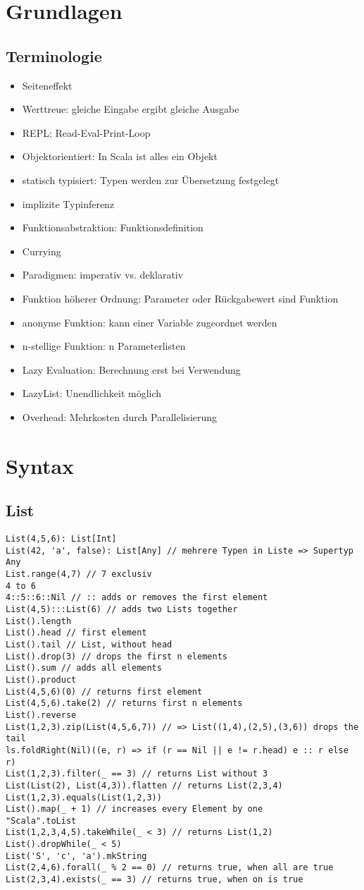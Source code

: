 \section{Grundlagen}
\subsection{Terminologie}
\begin{itemize}
	\item Seiteneffekt
	\item Werttreue: gleiche Eingabe ergibt gleiche Ausgabe
	\item REPL: Read-Eval-Print-Loop
	\item Objektorientiert: In Scala ist alles ein Objekt
	\item statisch typisiert: Typen werden zur Übersetzung festgelegt
	\item implizite Typinferenz
	\item Funktionsabstraktion: Funktionsdefinition
	\item Currying
	\item Paradigmen: imperativ vs. deklarativ
	\item Funktion höherer Ordnung: Parameter oder Rückgabewert sind Funktion
	\item anonyme Funktion: kann einer Variable zugeordnet werden
	\item n-stellige Funktion: n Parameterlisten
	\item Lazy Evaluation: Berechnung erst bei Verwendung
	\item LazyList: Unendlichkeit möglich
	\item Overhead: Mehrkosten durch Parallelisierung
\end{itemize}
\section{Syntax}
\subsection{List}
\begin{verbatim}
List(4,5,6): List[Int]
List(42, 'a', false): List[Any] // mehrere Typen in Liste => Supertyp Any
List.range(4,7) // 7 exclusiv
4 to 6
4::5::6::Nil // :: adds or removes the first element
List(4,5):::List(6) // adds two Lists together
List().length
List().head // first element
List().tail // List, without head
List().drop(3) // drops the first n elements
List().sum // adds all elements
List().product
List(4,5,6)(0) // returns first element
List(4,5,6).take(2) // returns first n elements
List().reverse
List(1,2,3).zip(List(4,5,6,7)) // => List((1,4),(2,5),(3,6)) drops the tail
ls.foldRight(Nil)((e, r) => if (r == Nil || e != r.head) e :: r else r)
List(1,2,3).filter(_ == 3) // returns List without 3
List(List(2), List(4,3)).flatten // returns List(2,3,4)
List(1,2,3).equals(List(1,2,3))
List().map(_ + 1) // increases every Element by one
"Scala".toList
List(1,2,3,4,5).takeWhile(_ < 3) // returns List(1,2)
List().dropWhile(_ < 5)
List('S', 'c', 'a').mkString
List(2,4,6).forall(_ % 2 == 0) // returns true, when all are true
List(2,3,4).exists(_ == 3) // returns true, when on is true
\end{verbatim}
